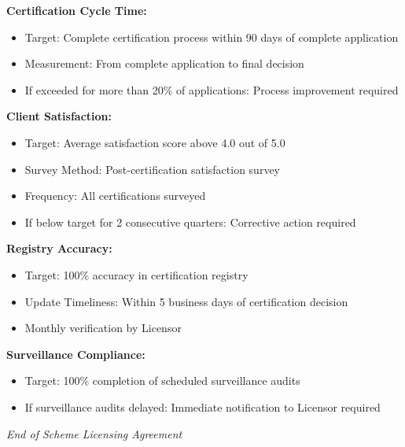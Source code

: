 \documentclass[11pt,a4paper]{article}
\begin{document}
\textbf{Certification Cycle Time:}

\begin{itemize}
\item Target: Complete certification process within 90 days of complete application
\item Measurement: From complete application to final decision
\item If exceeded for more than 20\% of applications: Process improvement required
\end{itemize}

\textbf{Client Satisfaction:}

\begin{itemize}
\item Target: Average satisfaction score above 4.0 out of 5.0
\item Survey Method: Post-certification satisfaction survey
\item Frequency: All certifications surveyed
\item If below target for 2 consecutive quarters: Corrective action required
\end{itemize}

\textbf{Registry Accuracy:}

\begin{itemize}
\item Target: 100\% accuracy in certification registry
\item Update Timeliness: Within 5 business days of certification decision
\item Monthly verification by Licensor
\end{itemize}

\textbf{Surveillance Compliance:}

\begin{itemize}
\item Target: 100\% completion of scheduled surveillance audits
\item If surveillance audits delayed: Immediate notification to Licensor required
\end{itemize}

\vspace{2em}

\begin{center}
\textit{End of Scheme Licensing Agreement}
\end{center}
\end{document}
